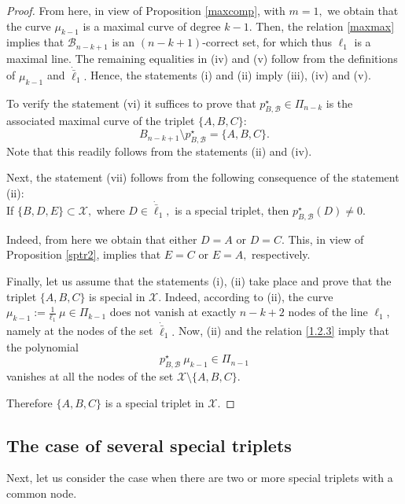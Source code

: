 \documentclass[a4paper,12pt]{article}
\theoremstyle{definition}
\numberwithin{equation}{section}
\numberwithin{figure}{section}
\newcommand{\Bset}{\mathcal{B}}
\newcommand{\Xset}{\mathcal{X}}
\begin{document}
\begin{proof}
From here, in view of Proposition \ref{maxcomp}, with $m=1,$ we obtain that the curve $\mu_{k-1}$ is a maximal curve of degree $k-1.$ Then, the relation \eqref{maxmax} implies that $\Bset_{n-k+1}$ is an  $(n-k+1)$-correct set, for which thus $\ell_1$ is a maximal line. The remaining equalities in (iv) and (v) follow from the definitions of $\mu_{k-1}$ and ${\dot{\bar{\ell}}}_1.$  Hence, the statements (i) and (ii) imply (iii), (iv) and (v). 

To verify the statement (vi) it suffices to prove that $p^\star_{B,\Bset}\in\Pi_{n-k}$ is the 
associated maximal curve of the triplet $\{A,B,C\}:$ 
\begin{equation}\label{1.2.3}B_{n-k+1}\setminus p^\star_{B,\Bset}=\{A,B,C\}.
\end{equation}
Note that this readily follows from the statements (ii) and (iv).

Next, the statement (vii) follows from the following consequence of the statement (ii): \\ 
If $\{B,D,E\}\subset\Xset,$ where $D\in \dot{\bar \ell}_1,$ is a special triplet, then $p^\star_{B,\Bset}(D)\neq 0.$

Indeed, from here we obtain that either $D=A$ or $D=C.$ This, in view of Proposition \ref{sptr2}, implies that $E=C$ or $E=A,$ respectively.


Finally, let us assume that the statements (i), (ii) take place and prove that the triplet $\{A,B,C\}$ is special in $\Xset.$ Indeed, according to (ii), the curve  $\mu_{k-1}:=\frac{1}{\ell_1}\ \mu\in\Pi_{k-1}$ does not vanish at exactly $n-k+2$ nodes of the line $\ell_1$, namely at the nodes of the set $\dot{\bar \ell}_1.$   Now, (ii) and the relation \eqref{1.2.3} imply  that the polynomial 
$$p^\star_{B,\Bset}\ \mu_{k-1}\in \Pi_{n-1}$$
 vanishes at all the nodes of the set $\Xset\setminus\{A,B,C\}.$

Therefore  $\{A,B,C\}$ is a special triplet in $\Xset.$
\end{proof}


\subsection{The case of several special triplets}

Next, let us consider the case when there are two or more special triplets with a common node. 
\end{document}
